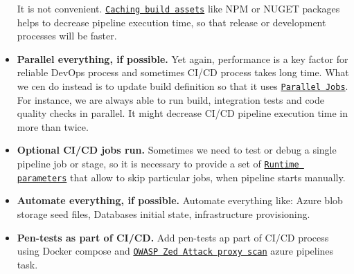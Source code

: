 \begin{itemize}
    It is not convenient.
    \href{https://learn.microsoft.com/en-us/azure/devops/pipelines/release/caching?view=azure-devops}
    {\texttt{Caching build assets}}
    like NPM or NUGET packages helps to decrease pipeline execution time, so that release or development
    processes will be faster.
    \item \textbf{Parallel everything, if possible.} Yet again, performance is a key factor for reliable DevOps process
    and sometimes CI/CD process takes long time.
    What we cen do instead is to update build definition so that it uses
    \href{https://learn.microsoft.com/en-us/azure/devops/pipelines/licensing/concurrent-jobs?view=azure-devops&tabs=ms-hosted}
    {\texttt{Parallel Jobs}}.
    For instance, we are always able to run build, integration tests and code quality checks in parallel.
    It might decrease CI/CD pipeline execution time in more than twice.
    \item \textbf{Optional CI/CD jobs run.} Sometimes we need to test or debug a single pipeline job or stage, so it is
    necessary to provide a set of
    \href{https://learn.microsoft.com/en-us/azure/devops/pipelines/process/runtime-parameters?view=azure-devops&tabs=script}
    {\texttt{Runtime parameters}}
    that allow to skip particular jobs, when pipeline starts manually.
    \item \textbf{Automate everything, if possible.}
    Automate everything like: Azure blob storage seed files, Databases initial state, infrastructure provisioning.
    \item \textbf{Pen-tests as part of CI/CD.} Add pen-tests ap part of CI/CD process using Docker compose and
    \href{https://marketplace.visualstudio.com/items?itemName=kasunkodagoda.owasp-zap-scan}
    {\texttt{OWASP Zed Attack proxy scan}}
    azure pipelines task.
\end{itemize}